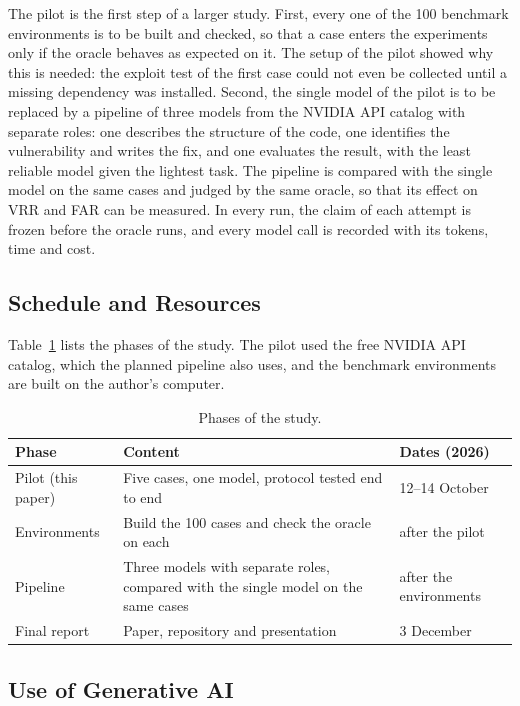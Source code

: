 \documentclass[ai,article,submit,oneauthor]{Definitions/mdpi}
\begin{document}
The pilot is the first step of a larger study. First, every one of the 100 benchmark environments is to be built and checked, so that a case enters the experiments only if the oracle behaves as expected on it. The setup of the pilot showed why this is needed: the exploit test of the first case could not even be collected until a missing dependency was installed. Second, the single model of the pilot is to be replaced by a pipeline of three models from the NVIDIA API catalog with separate roles: one describes the structure of the code, one identifies the vulnerability and writes the fix, and one evaluates the result, with the least reliable model given the lightest task. The pipeline is compared with the single model on the same cases and judged by the same oracle, so that its effect on VRR and FAR can be measured. In every run, the claim of each attempt is frozen before the oracle runs, and every model call is recorded with its tokens, time and cost.

\subsection{Schedule and Resources}

Table~\ref{tab:schedule} lists the phases of the study. The pilot used the free NVIDIA API catalog, which the planned pipeline also uses, and the benchmark environments are built on the author's computer.

\begin{table}[H]
\caption{Phases of the study.\label{tab:schedule}}
\begin{tabularx}{\textwidth}{lXl}
\toprule
\textbf{Phase} & \textbf{Content} & \textbf{Dates (2026)} \\
\midrule
Pilot (this paper) & Five cases, one model, protocol tested end to end & 12--14 October \\
Environments & Build the 100 cases and check the oracle on each & after the pilot \\
Pipeline & Three models with separate roles, compared with the single model on the same cases & after the environments \\
Final report & Paper, repository and presentation & 3 December \\
\bottomrule
\end{tabularx}
\end{table}

\subsection{Use of Generative AI}\label{sec:ai}
\end{document}
